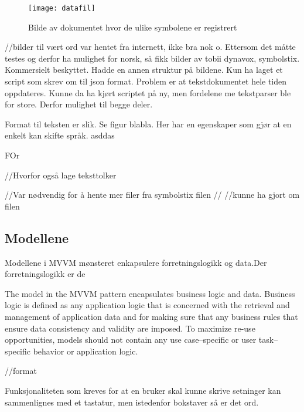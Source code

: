 {\begin{figure}[ht!] 
\centering 
\texttt{[image: datafil]} 
\caption{Bilde av dokumentet hvor de ulike symbolene er registrert} 
\label{fig:skrivebord} 
\end{figure} 

//bilder til vært ord var hentet fra internett, ikke bra nok o.
Ettersom det måtte testes og derfor ha mulighet for norsk, så fikk bilder av tobii dynavox, symbolstix. Kommersielt beskyttet. Hadde en annen struktur på bildene. Kun ha laget et script som skrev om til json format. Problem er at tekstdokumentet hele tiden oppdateres. Kunne da ha kjørt scriptet på ny, men fordelene me tekstparser ble for store. Derfor mulighet til begge deler. 

Format til teksten er slik. Se figur blabla. Her har en egenskaper som gjør at en enkelt kan skifte språk. asddas


FOr

//Hvorfor også lage teksttolker
    
    //Var nødvendig for å hente mer filer fra symbolstix filen
    // 
    //kunne ha gjort om filen 


\subsection{Modellene}

Modellene i MVVM mønsteret enkapsulere forretningslogikk og data.Der forretningslogikk er de

The model in the MVVM pattern encapsulates business logic and data. Business logic is defined as any application logic that is concerned with the retrieval and management of application data and for making sure that any business rules that ensure data consistency and validity are imposed. To maximize re-use opportunities, models should not contain any use case–specific or user task–specific behavior or application logic.













//format









Funksjonaliteten som kreves for at en bruker skal kunne skrive setninger kan sammenlignes med et tastatur, men istedenfor bokstaver så er det ord.  



}
